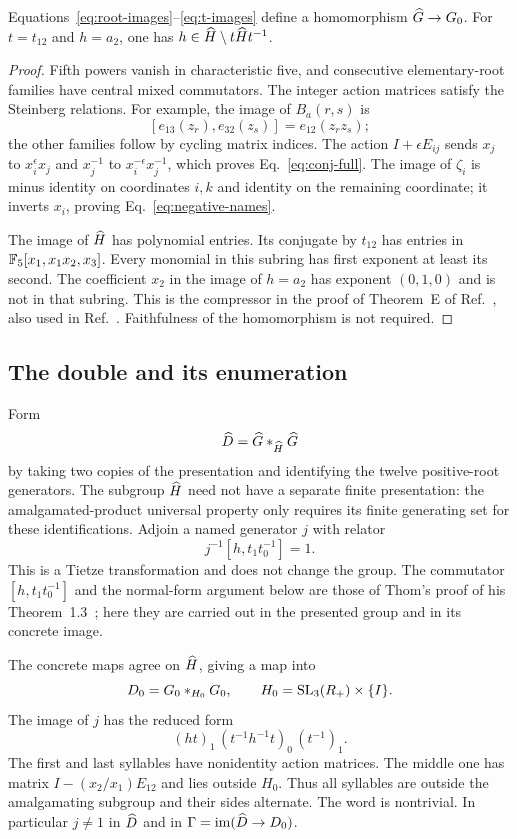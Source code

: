 \begin{lemma}\label{lem:image}
Equations~\eqref{eq:root-images}--\eqref{eq:t-images} define a homomorphism
$\widehat G\to G_0$. For $t=t_{12}$ and $h=a_2$, one has
$h\in\widehat H\setminus t\widehat H t^{-1}$.
\end{lemma}
\begin{proof}
Fifth powers vanish in characteristic five, and consecutive elementary-root families have
central mixed commutators. The integer action matrices satisfy the Steinberg relations.
For example, the image of $B_a(r,s)$ is
\[
 [e_{13}(z_r),e_{32}(z_s)]=e_{12}(z_rz_s);
\]
the other families follow by cycling matrix indices. The action $I+\epsilon E_{ij}$
sends $x_j$ to $x_i^\epsilon x_j$ and $x_j^{-1}$ to $x_i^{-\epsilon}x_j^{-1}$,
which proves Eq.~\eqref{eq:conj-full}. The image of $\zeta_i$ is minus identity on
coordinates $i,k$ and identity on the remaining coordinate; it inverts $x_i$, proving
Eq.~\eqref{eq:negative-names}.

The image of $\widehat H$ has polynomial entries. Its conjugate by $t_{12}$ has entries in
$\mathbb F_5[x_1,x_1x_2,x_3]$. Every monomial in this subring has first exponent at least its
second. The coefficient $x_2$ in the image of $h=a_2$ has exponent $(0,1,0)$ and is not
in that subring. This is the compressor in the proof of Theorem~E of Ref.~\cite{kt}, also
used in Ref.~\cite[Section~5.2]{thom}. Faithfulness of the homomorphism is not required.
\end{proof}

\subsection{The double and its enumeration}
Form
\[
 \widehat D=\widehat G*_{\widehat H}\widehat G
\]
by taking two copies of the presentation and identifying the twelve positive-root generators.
The subgroup $\widehat H$ need not have a separate finite presentation: the amalgamated-product
universal property only requires its finite generating set for these identifications.
Adjoin a named generator $j$ with relator
\begin{equation}
 j^{-1}[h,t_1t_0^{-1}]=1.
 \label{eq:j-name}
\end{equation}
This is a Tietze transformation and does not change the group. The commutator
$[h,t_1t_0^{-1}]$ and the normal-form argument below are those of Thom's proof of his
Theorem~1.3~\cite[Section~5.2]{thom}; here they are carried out in the presented group and in
its concrete image.

The concrete maps agree on $\widehat H$, giving a map into
\begin{equation}
 D_0=G_0*_{H_0}G_0,\qquad H_0=\operatorname{SL}_3(R_+)\times\{I\}.
 \label{eq:concrete-double}
\end{equation}
The image of $j$ has the reduced form
\begin{equation}
 (ht)_1\,(t^{-1}h^{-1}t)_0\,(t^{-1})_1.
 \label{eq:j-normal}
\end{equation}
The first and last syllables have nonidentity action matrices. The middle one has matrix
$I-(x_2/x_1)E_{12}$ and lies outside $H_0$. Thus all syllables are outside the amalgamating
subgroup and their sides alternate. The word is nontrivial. In particular $j\ne1$ in
$\widehat D$ and in $\Gamma=\operatorname{im}(\widehat D\to D_0)$.

